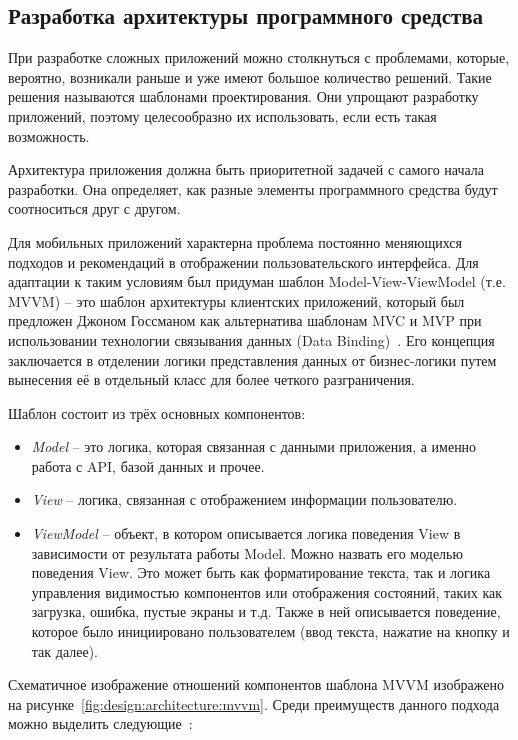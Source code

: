 \subsection{Разработка архитектуры программного средства}
\label{sec:design:architecture}

При разработке сложных приложений можно столкнуться с проблемами, которые, вероятно, возникали раньше и уже имеют большое количество решений.
Такие решения называются шаблонами проектирования.
Они упрощают разработку приложений, поэтому целесообразно их использовать, если есть такая возможность.

Архитектура приложения должна быть приоритетной задачей с самого начала разработки.
Она определяет, как разные элементы программного средства будут соотноситься друг с другом.

Для мобильных приложений характерна проблема постоянно меняющихся подходов и рекомендаций в отображении пользовательского интерфейса.
Для адаптации к таким условиям был придуман шаблон Model-View-ViewModel (т.е. MVVM) -- это шаблон архитектуры клиентских приложений, который был предложен Джоном Госсманом как альтернатива шаблонам MVC и MVP при использовании технологии связывания данных (Data Binding)~\cite{microsoft_mvvm}.
Его концепция заключается в отделении логики представления данных от бизнес-логики путем вынесения её в отдельный класс для более четкого разграничения.

Шаблон состоит из трёх основных компонентов:
\begin{itemize}
    \item \emph{Model} -- это логика, которая связанная с данными приложения, а именно работа с API, базой данных и прочее.
    \item \emph{View} -- логика, связанная с отображением информации пользователю.
    \item \emph{ViewModel} -- объект, в котором описывается логика поведения View в зависимости от результата работы Model. Можно назвать его моделью поведения View. Это может быть как форматирование текста, так и логика управления видимостью компонентов или отображения состояний, таких как загрузка, ошибка, пустые экраны и т.д. Также в ней описывается поведение, которое было инициировано пользователем (ввод текста, нажатие на кнопку и так далее).
\end{itemize}

Схематичное изображение отношений компонентов шаблона MVVM изображено на рисунке~\ref{fig:design:architecture:mvvm}.
Среди преимуществ данного подхода можно выделить следующие~\cite{android_mvvm}:

